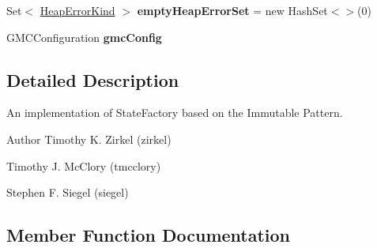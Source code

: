 \begin{DoxyCompactItemize}
\item 
\hypertarget{classedu_1_1udel_1_1cis_1_1vsl_1_1civl_1_1state_1_1common_1_1immutable_1_1ImmutableStateFactory_abc4d794bb46aebe402fc0ae86a758145}{}Set$<$ \hyperlink{enumedu_1_1udel_1_1cis_1_1vsl_1_1civl_1_1state_1_1IF_1_1CIVLHeapException_1_1HeapErrorKind}{Heap\+Error\+Kind} $>$ {\bfseries empty\+Heap\+Error\+Set} = new Hash\+Set$<$$>$(0)\label{classedu_1_1udel_1_1cis_1_1vsl_1_1civl_1_1state_1_1common_1_1immutable_1_1ImmutableStateFactory_abc4d794bb46aebe402fc0ae86a758145}

\item 
\hypertarget{classedu_1_1udel_1_1cis_1_1vsl_1_1civl_1_1state_1_1common_1_1immutable_1_1ImmutableStateFactory_a93bb101beff17f74873a8ad73d6197b6}{}G\+M\+C\+Configuration {\bfseries gmc\+Config}\label{classedu_1_1udel_1_1cis_1_1vsl_1_1civl_1_1state_1_1common_1_1immutable_1_1ImmutableStateFactory_a93bb101beff17f74873a8ad73d6197b6}

\end{DoxyCompactItemize}


\subsection{Detailed Description}
An implementation of State\+Factory based on the Immutable Pattern. 

\begin{DoxyAuthor}{Author}
Timothy K. Zirkel (zirkel) 

Timothy J. Mc\+Clory (tmcclory) 

Stephen F. Siegel (siegel) 
\end{DoxyAuthor}


\subsection{Member Function Documentation}
\hypertarget{classedu_1_1udel_1_1cis_1_1vsl_1_1civl_1_1state_1_1common_1_1immutable_1_1ImmutableStateFactory_a1b0ab2bb34419888f0a80b1a6c9ac756}{}
